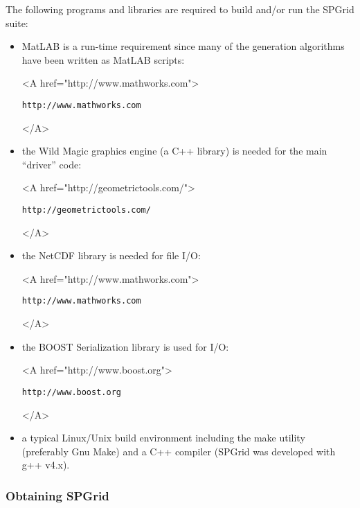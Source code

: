 The following programs and libraries are required to build and/or run
the SPGrid suite:
\begin{itemize}
\item MatLAB is a run-time requirement since many of the generation
  algorithms have been written as MatLAB scripts: \\
  \begin{rawhtml} <A href="http://www.mathworks.com"> \end{rawhtml}
  \texttt{http://www.mathworks.com}
  \begin{rawhtml} </A> \end{rawhtml}

\item the Wild Magic graphics engine (a C++ library) is needed for the
  main ``driver'' code: \\
  \begin{rawhtml} <A href="http://geometrictools.com/"> \end{rawhtml}
  \texttt{http://geometrictools.com/}
  \begin{rawhtml} </A> \end{rawhtml}

\item the NetCDF library is needed for file I/O: \\
  \begin{rawhtml} <A href="http://www.mathworks.com"> \end{rawhtml}
  \texttt{http://www.mathworks.com}
  \begin{rawhtml} </A> \end{rawhtml}

\item the BOOST Serialization library is used for I/O: \\
  \begin{rawhtml} <A href="http://www.boost.org"> \end{rawhtml}
  \texttt{http://www.boost.org}
  \begin{rawhtml} </A> \end{rawhtml}

\item a typical Linux/Unix build environment including the make
  utility (preferably Gnu Make) and a C++ compiler (SPGrid was
  developed with g++ v4.x).
\end{itemize}


\subsubsection{Obtaining SPGrid}

